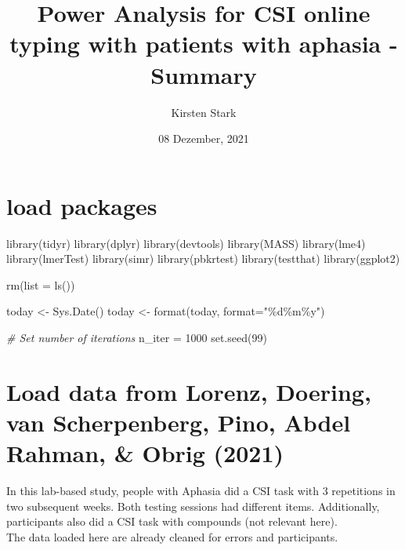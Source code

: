 \documentclass[
]{article}
\title{Power Analysis for CSI online typing with patients with aphasia -
Summary}
\author{Kirsten Stark}
\date{08 Dezember, 2021}
\newenvironment{Shaded}{\begin{snugshade}}{\end{snugshade}}
\newcommand{\AttributeTok}[1]{\textcolor[rgb]{0.77,0.63,0.00}{#1}}
\newcommand{\CommentTok}[1]{\textcolor[rgb]{0.56,0.35,0.01}{\textit{#1}}}
\newcommand{\DecValTok}[1]{\textcolor[rgb]{0.00,0.00,0.81}{#1}}
\newcommand{\FunctionTok}[1]{\textcolor[rgb]{0.00,0.00,0.00}{#1}}
\newcommand{\NormalTok}[1]{#1}
\newcommand{\OtherTok}[1]{\textcolor[rgb]{0.56,0.35,0.01}{#1}}
\newcommand{\StringTok}[1]{\textcolor[rgb]{0.31,0.60,0.02}{#1}}
\begin{document}
\maketitle

\hypertarget{load-packages}{%
\section{load packages}\label{load-packages}}

\begin{Shaded}
\begin{Highlighting}[]
\FunctionTok{library}\NormalTok{(tidyr)}
\FunctionTok{library}\NormalTok{(dplyr)}
\FunctionTok{library}\NormalTok{(devtools)}
\FunctionTok{library}\NormalTok{(MASS)}
\FunctionTok{library}\NormalTok{(lme4)}
\FunctionTok{library}\NormalTok{(lmerTest)}
\FunctionTok{library}\NormalTok{(simr)}
\FunctionTok{library}\NormalTok{(pbkrtest)}
\FunctionTok{library}\NormalTok{(testthat)}
\FunctionTok{library}\NormalTok{(ggplot2)}

\FunctionTok{rm}\NormalTok{(}\AttributeTok{list =} \FunctionTok{ls}\NormalTok{())}

\NormalTok{today }\OtherTok{\textless{}{-}} \FunctionTok{Sys.Date}\NormalTok{()}
\NormalTok{today }\OtherTok{\textless{}{-}} \FunctionTok{format}\NormalTok{(today, }\AttributeTok{format=}\StringTok{"\%d\%m\%y"}\NormalTok{)}

\CommentTok{\# Set number of iterations }
\NormalTok{n\_iter }\OtherTok{=} \DecValTok{1000}
\FunctionTok{set.seed}\NormalTok{(}\DecValTok{99}\NormalTok{)}
\end{Highlighting}
\end{Shaded}

\hypertarget{load-data-from-lorenz-doering-van-scherpenberg-pino-abdel-rahman-obrig-2021}{%
\section{Load data from Lorenz, Doering, van Scherpenberg, Pino, Abdel
Rahman, \& Obrig
(2021)}\label{load-data-from-lorenz-doering-van-scherpenberg-pino-abdel-rahman-obrig-2021}}

In this lab-based study, people with Aphasia did a CSI task with 3
repetitions in two subsequent weeks. Both testing sessions had different
items. Additionally, participants also did a CSI task with compounds
(not relevant here).\\
The data loaded here are already cleaned for errors and participants.
\end{document}
